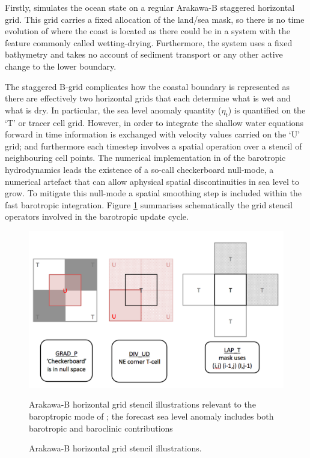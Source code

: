 Firstly, \BL{} simulates the ocean state on a regular Arakawa-B staggered horizontal grid.
This grid carries a fixed allocation of the land/sea mask, so there is no time evolution of where the coast is located as there could be in a system with the feature commonly called wetting-drying.
Furthermore, the system uses a fixed bathymetry and takes no account of sediment transport or any other active change to the lower boundary.

The staggered B-grid complicates how the coastal boundary is represented as there are effectively two horizontal grids that each determine what is wet and what is dry.
In particular, the sea level anomaly quantity ($\eta_t$) is quantified on the `T' or tracer cell grid.    However, in order to integrate the shallow water equations forward in time information is exchanged with velocity values carried on the `U' grid; and furthermore each timestep involves a spatial operation over a stencil of neighbouring cell points. 
The numerical implementation in \BL{} of the barotropic hydrodynamics leads the existence of a so-call checkerboard null-mode, a numerical artefact that can allow aphysical spatial discontinuities in sea level to grow.   To mitigate this null-mode a spatial smoothing step is included within the fast barotropic integration. Figure \ref{fig:gridStencil} summarises schematically the grid stencil operators involved in the barotropic update cycle.
\begin{figure}[H]
    \begin{center}
    \includegraphics[width=\figwidthBig]{figures/diagrams/mom_BT_stencils_extra.png}
    \caption{Arakawa-B horizontal grid stencil illustrations.}
            {Arakawa-B horizontal grid stencil illustrations relevant to the baroptropic mode of \BL{}; the forecast sea level anomaly includes both barotropic and baroclinic contributions}
    \end{center}
    \label{fig:gridStencil}
\end{figure}
